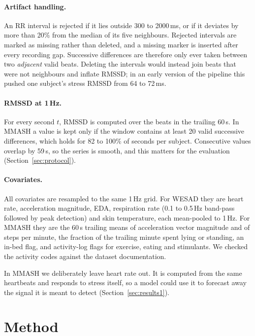 \documentclass[11pt,a4paper]{article}
\begin{document}
\paragraph{Artifact handling.} An RR interval is rejected if it lies outside 300 to 2000\,ms, or if it deviates by more than 20\% from the median of its five neighbours. Rejected intervals are marked as missing rather than deleted, and a missing marker is inserted after every recording gap. Successive differences are therefore only ever taken between two \emph{adjacent} valid beats. Deleting the intervals would instead join beats that were not neighbours and inflate RMSSD; in an early version of the pipeline this pushed one subject's stress RMSSD from 64 to 72\,ms.

\paragraph{RMSSD at 1\,Hz.} For every second $t$, RMSSD is computed over the beats in the trailing 60\,s. In MMASH a value is kept only if the window contains at least 20 valid successive differences, which holds for 82 to 100\% of seconds per subject. Consecutive values overlap by 59\,s, so the series is smooth, and this matters for the evaluation (Section~\ref{sec:protocol}).

\paragraph{Covariates.} All covariates are resampled to the same 1\,Hz grid. For WESAD they are heart rate, acceleration magnitude, EDA, respiration rate (0.1 to 0.5\,Hz band-pass followed by peak detection) and skin temperature, each mean-pooled to 1\,Hz. For MMASH they are the 60\,s trailing means of acceleration vector magnitude and of steps per minute, the fraction of the trailing minute spent lying or standing, an in-bed flag, and activity-log flags for exercise, eating and stimulants. We checked the activity codes against the dataset documentation.

In MMASH we deliberately leave heart rate out. It is computed from the same heartbeats and responds to stress itself, so a model could use it to forecast away the signal it is meant to detect (Section~\ref{sec:results1}).

\section{Method}
\end{document}
